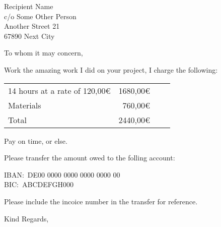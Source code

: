 \documentclass[
	11pt,
	a4paper,
	letter,
	parskip=yes,
	fromemail,
	fromphone
]{scrlttr2} %
\date{\DTMdate{2023-10-31}}
\begin{document}
\begin{letter}{%
		Recipient Name\\
		c/o Some Other Person\\
		Another Street 21\\[\medskipamount]
		67890 Next City}


	\opening{To whom it may concern,}

	Work the amazing work I did on your project, I charge the following:

	\begin{tabularx}{\textwidth}{@{}Xr@{}Xr}
		14 hours at a rate of 120,00€		&  1680,00€ \\
		Materials 											&   760,00€ \\
		\midrule
		Total														& 2440,00€ \\
		\bottomrule
	\end{tabularx}

	Pay on time, or else.

	Please transfer the amount owed to the folling account:

	IBAN:\ DE00 0000 0000 0000 0000 00\\
	BIC:\ ABCDEFGH000

	Please include the incoice number in the transfer for reference.

	\closing{Kind Regards,}

\end{letter}
\end{document}
